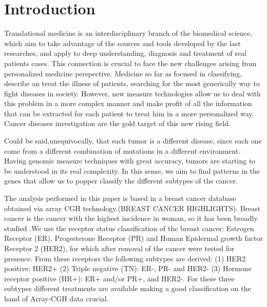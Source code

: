 \documentclass[a4paper]{article}
\begin{document}
\section{Introduction}




Translational medicine is an interdisciplinary branch of the biomedical science, which aim to take advantage of the sources and tools developed by the last researches, and apply to deep understanding, diagnosis and treatment of real patients cases.  This connection is crucial to face the new challenges arising from personalized medicine perspective. Medicine so far as focused in classifying, describe an treat the illness of patients, searching for the most generically way to fight diseases in society. However, new measure technologies allow us to deal with this problem in a more complex manner and make profit of all the information that can be  extracted for each patient to treat him in a more personalized way. Cancer diseases investigation are the gold target of this new rising field. 

Could be said,unequivocally, that each tumor is a different disease, since each one come from a different combination of mutations in a different environment. Having genomic measure techniques with great accuracy, tumors are starting to be understood in its real complexity.  In this sense, we aim to find patterns in the genes that allow us to  popper classify the different subtypes of the cancer.



The analysis performed in this paper is based in a breast cancer database obtained via array CGH technology.(BREAST CANCER HIGHLIGHTS). Breast cancer is the cancer with the highest incidence in woman, so it has been broadly studied .We use the receptor status classification of the  breast cancer:  Estrogen  Receptor (ER), Progesterone Receptor (PR) and Human Epidermal growth factor Receptor 2 (HER2), for which after removal of the cancer were tested for presence. From these receptors the following subtypes are derived: (1) HER2 positive: HER2+ (2) Triple negative (TN): ER-, PR- and HER2- (3) Hormone receptor positive (HR+): ER+ and/or PR+, and HER2-. For these three subtypes different treatments are available making a good classification on the hand of Array-CGH data crucial.
\end{document}
